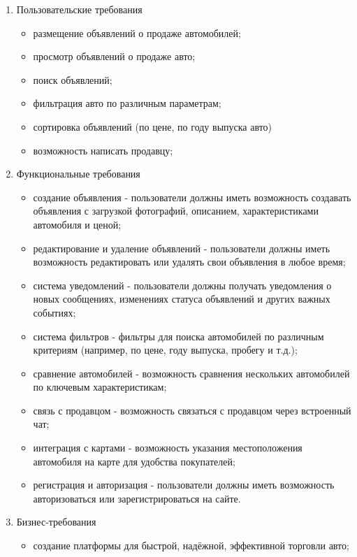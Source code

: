 \begin{enumerate}
    \item Пользовательские требования
        \begin{itemize}
            \item размещение объявлений о продаже автомобилей;
            \item просмотр объявлений о продаже авто;
            \item поиск объявлений;
            \item фильтрация авто по различным параметрам;
            \item сортировка объявлений (по цене, по году выпуска авто)
            \item возможность написать продавцу;
        \end{itemize}
    \item Функциональные требования
        \begin{itemize}
            \item создание объявления - пользователи должны иметь возможность создавать объявления с загрузкой фотографий, описанием, характеристиками автомобиля и ценой;
            \item редактирование и удаление объявлений - пользователи должны иметь возможность редактировать или удалять свои объявления в любое время;
            \item система уведомлений - пользователи должны получать уведомления о новых сообщениях, изменениях статуса объявлений и других важных событиях;
            \item система фильтров - фильтры для поиска автомобилей по различным критериям (например, по цене, году выпуска, пробегу и т.д.);
            \item сравнение автомобилей - возможность сравнения нескольких автомобилей по ключевым характеристикам;
            \item связь с продавцом - возможность связаться с продавцом через встроенный чат;
            \item интеграция с картами - возможность указания местоположения автомобиля на карте для удобства покупателей;
            \item регистрация и авторизация - пользователи должны иметь возможность авторизоваться или зарегистрироваться на сайте.
        \end{itemize}
    \item Бизнес-требования
        \begin{itemize}
            \item создание платформы для быстрой, надёжной, эффективной торговли авто;

\end{itemize}
\end{enumerate}
